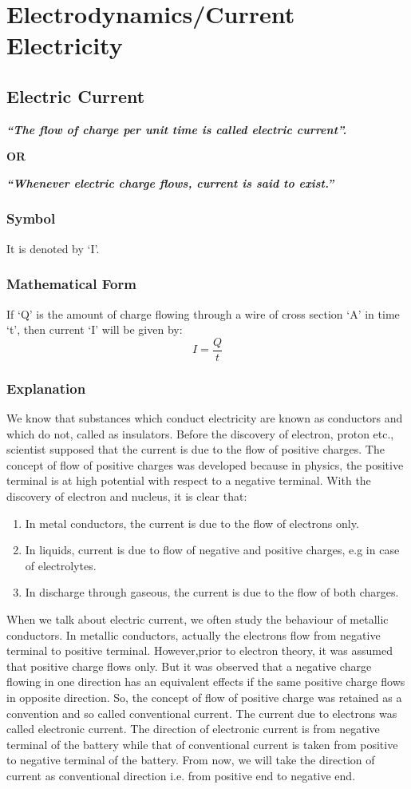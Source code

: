 \chapter{Electrodynamics/Current Electricity}
\section{Electric Current}
\textit{\textbf{“The flow of charge per unit time is called electric current”.}}
\begin{center}
    \textbf{OR}
\end{center}
\textit{\textbf{“Whenever electric charge flows, current is said to exist.”}}
\subsection*{Symbol}
It is denoted by `I'.
\subsection*{Mathematical Form}
If `Q' is the amount of charge flowing through a wire of cross section ‘A’ in time ‘t’, then current ‘I’ will be given by:
\begin{equation}\label{eq:12.1}
    I = \frac{Q}{t}
\end{equation}   
\subsection*{Explanation}
We know that substances which conduct electricity are known as conductors and which do not, called as insulators. Before the discovery of electron, proton etc., scientist supposed that the current is due to the flow of positive charges. The concept of flow of positive charges was developed because in physics, the positive terminal is at high potential with respect to a negative terminal. With the discovery of electron and nucleus, it is clear that:
\begin{enumerate}[label = (\roman*)]
    \item In metal conductors, the current is due to the flow of electrons only.
    \item In liquids, current is due to flow of negative and positive charges, e.g in case of electrolytes.
    \item In discharge through gaseous, the current is due to the flow of both charges.
\end{enumerate}
When we talk about electric current, we often study the behaviour of metallic conductors. In metallic conductors, actually the electrons flow from negative terminal to positive terminal. However,prior to electron theory, it was assumed that positive charge flows only. But it was observed that a negative charge flowing in one direction has an equivalent effects if the same positive charge flows in opposite direction. So, the concept of flow of positive charge was retained as a convention and so called conventional current. The current due to electrons was called electronic current. The direction of electronic current is from negative terminal of the battery while that of conventional current is taken from positive to negative terminal of the battery.
From now, we will take the direction of current as conventional direction 
i.e. from positive end to negative end.

